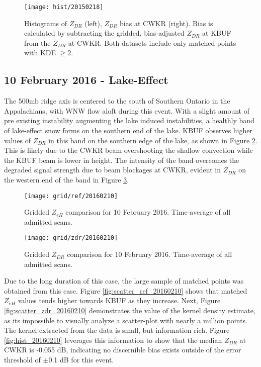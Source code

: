 \begin{figure}[H]
\texttt{[image: hist/20150218]}\centering
\caption{Histograms of $Z_{DR}$ (left), $Z_{DR}$ bias at CWKR (right). Bias is calculated by subtracting the gridded, bias-adjusted $Z_{DR}$ at KBUF from the
$Z_{DR}$ at CWKR. Both datasets include only matched points with KDE $\geq 2$.} 
\label{fig:hist_20150218}
\end{figure}

\subsection{10 February 2016 - Lake-Effect}
The 500mb ridge axis is centered to the south of Southern Ontario in the Appalachians, with WNW flow aloft during this event. With a slight amount of pre
existing instability augmenting the lake induced instabilities, a healthly band of lake-effect snow forms on the southern end of the lake. KBUF observes
higher values of $Z_{DR}$ in this band on the southern edge of the lake, as shown in Figure \ref{fig:grid_ref_20160210}. This is likely due to the CWKR beam
overshooting the shallow convection while the KBUF beam is lower in height. The intensity of the band overcomes the degraded signal strength due to beam
blockages at CWKR, evident in $Z_{DR}$ on the western end of the band in Figure \ref{fig:grid_zdr_20160210}. 
\begin{figure}[H]
\texttt{[image: grid/ref/20160210]}
\caption{Gridded $Z_{eH}$ comparison for 10 February 2016. Time-average of all admitted scans.} 
\label{fig:grid_ref_20160210}
\end{figure}

\begin{figure}[H]
\texttt{[image: grid/zdr/20160210]}
\caption{Gridded $Z_{DR}$ comparison for 10 February 2016. Time-average of all admitted scans.} 
\label{fig:grid_zdr_20160210}
\end{figure}

\vspace{5mm}

Due to the long duration of this case, the large
sample of matched points was obtained from this case. Figure \ref{fig:scatter_ref_20160210} shows that matched $Z_{eH}$ values tends higher towards KBUF as
they increase. Next, Figure \ref{fig:scatter_zdr_20160210} demonstrates the value of the kernel density estimate, as its impossible to visually analyze a
scatter-plot with nearly a million points. The kernel extracted from the data is small, but information rich. Figure \ref{fig:hist_20160210} leverages this
information to show that the median $Z_{DR}$ at CWKR is -0.055 dB, indicating no discernible bias exists outside of the error threshold of $\pm$0.1 dB for
this event.

